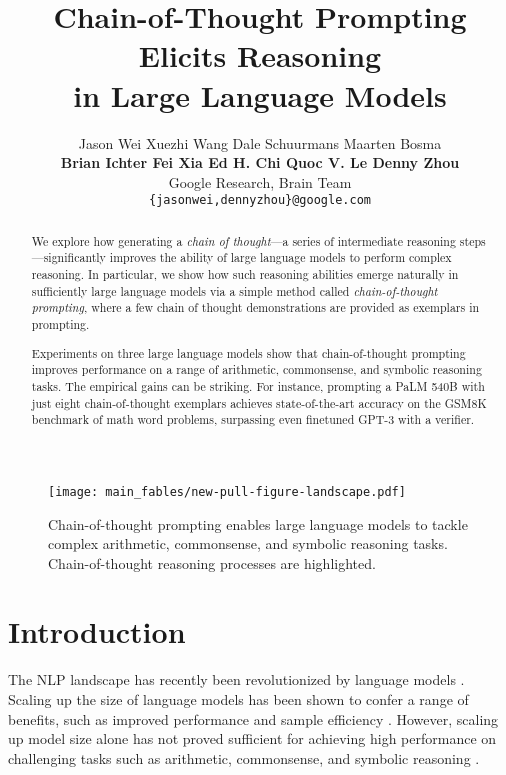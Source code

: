 \documentclass[]{article}
\title{Chain-of-Thought Prompting Elicits Reasoning \\ in Large Language Models}
\author{%
  \vspace{2.5mm}
  Jason Wei \hspace{6mm} Xuezhi Wang \hspace{6mm} Dale Schuurmans \hspace{6mm} Maarten Bosma \\
  \vspace{3mm}
  \textbf{Brian Ichter \hspace{5mm} Fei Xia \hspace{5mm} Ed H. Chi \hspace{5mm} Quoc V. Le \hspace{5mm} Denny Zhou} \\
  Google Research, Brain Team \\
  \vspace{3mm}
  \texttt{\{jasonwei,dennyzhou\}@google.com} \\
}
\theoremstyle{plain}
\theoremstyle{definition}
\theoremstyle{remark}
\begin{document}
\maketitle

\begin{abstract}

We explore how generating a \textit{chain of thought}---a series of intermediate reasoning steps---significantly improves the ability of large language models to perform complex reasoning.
In particular, we show how such reasoning abilities emerge naturally in sufficiently large language models via a simple method called \textit{chain-of-thought prompting}, where a few chain of thought demonstrations are provided as exemplars in prompting.

Experiments on three large language models show that chain-of-thought prompting improves performance on a range of arithmetic, commonsense, and symbolic reasoning tasks.
The empirical gains can be striking.
For instance, prompting a PaLM 540B with just eight chain-of-thought exemplars achieves state-of-the-art accuracy on the GSM8K benchmark of math word problems, surpassing even finetuned GPT-3 with a verifier.

\end{abstract}


\begin{figure}[H]
\centering
\texttt{[image: main\_fables/new-pull-figure-landscape.pdf]}
\caption{
Chain-of-thought prompting enables large language models to tackle complex arithmetic, commonsense, and symbolic reasoning tasks.
Chain-of-thought reasoning processes are highlighted.
}
\label{fig:pull-figure}
\end{figure} 

\newpage


\section{Introduction}
The NLP landscape has recently been revolutionized by language models \citep[][\textit{inter alia}]{peters-etal-2018-deep,devlin-etal-2019-bert,brown2020language}.
Scaling up the size of language models has been shown to confer a range of benefits, such as improved performance and sample efficiency  \citep[\textit{inter alia}]{kaplan2020scaling,brown2020language}.
However, scaling up model size alone has not proved sufficient for achieving high performance on challenging tasks such as arithmetic, commonsense, and symbolic reasoning \citep{rae2021scaling}.
\end{document}
